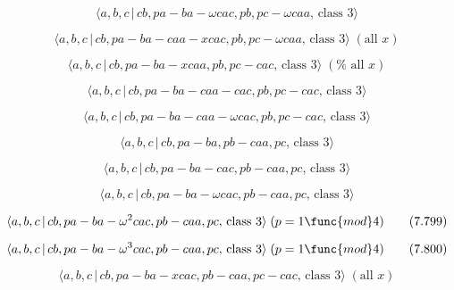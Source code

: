 \documentclass[10pt]{article}
\begin{document}
\begin{equation}
\langle a,b,c\,|\,cb,pa-ba-\omega cac,pb,pc-\omega caa,\,\text{class }%
3\rangle  \tag{7.791}
\end{equation}

\begin{equation}
\langle a,b,c\,|\,cb,pa-ba-caa-xcac,pb,pc-\omega caa,\,\text{class }3\rangle
\;(\text{all }x)  \tag{7.792}
\end{equation}

\begin{equation}
\langle a,b,c\,|\,cb,pa-ba-xcaa,pb,pc-cac,\,\text{class }3\rangle \;(\text{%
all }x)  \tag{7.793}
\end{equation}

\begin{equation}
\langle a,b,c\,|\,cb,pa-ba-caa-cac,pb,pc-cac,\,\text{class }3\rangle 
\tag{7.794}
\end{equation}

\begin{equation}
\langle a,b,c\,|\,cb,pa-ba-caa-\omega cac,pb,pc-cac,\,\text{class }3\rangle 
\tag{7.795}
\end{equation}

\begin{equation}
\langle a,b,c\,|\,cb,pa-ba,pb-caa,pc,\,\text{class }3\rangle  \tag{7.796}
\end{equation}

\begin{equation}
\langle a,b,c\,|\,cb,pa-ba-cac,pb-caa,pc,\,\text{class }3\rangle  \tag{7.797}
\end{equation}

\begin{equation}
\langle a,b,c\,|\,cb,pa-ba-\omega cac,pb-caa,pc,\,\text{class }3\rangle 
\tag{7.798}
\end{equation}

\begin{equation}
\langle a,b,c\,|\,cb,pa-ba-\omega ^{2}cac,pb-caa,pc,\,\text{class }3\rangle
\;(p=1\func{mod}4)  \tag{7.799}
\end{equation}

\begin{equation}
\langle a,b,c\,|\,cb,pa-ba-\omega ^{3}cac,pb-caa,pc,\,\text{class }3\rangle
\;(p=1\func{mod}4)  \tag{7.800}
\end{equation}

\begin{equation}
\langle a,b,c\,|\,cb,pa-ba-xcac,pb-caa,pc-cac,\,\text{class }3\rangle \;(%
\text{all }x)  \tag{7.801}
\end{equation}
\end{document}
